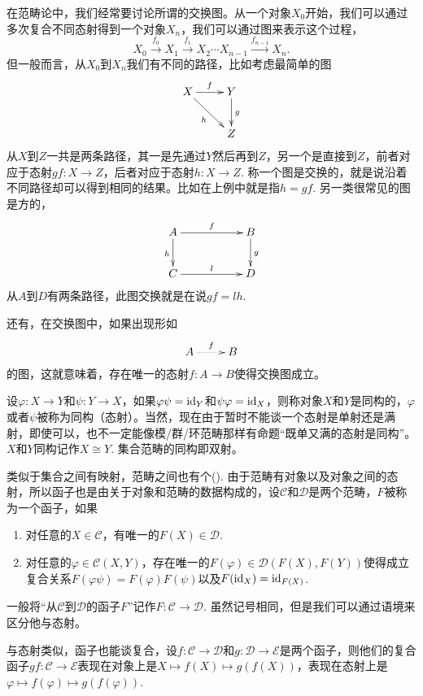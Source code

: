 \para 在范畴论中，我们经常要讨论所谓的交换图。从一个对象$X_0$开始，我们可以通过多次复合不同态射得到一个对象$X_n$，我们可以通过图来表示这个过程，
\[
	X_0\xrightarrow{f_0} X_1\xrightarrow{f_1} X_2\cdots X_{n-1}\xrightarrow{f_{n-1}} X_n.
\]
但一般而言，从$X_0$到$X_n$我们有不同的路径，比如考虑最简单的图
\[
\begin{xy}
	\xymatrix{
		X\ar[r]^{f} \ar[dr]_{h}&Y \ar[d]^{g}\\
		&Z
	}
\end{xy}
\]
从$X$到$Z$一共是两条路径，其一是先通过$Y$然后再到$Z$，另一个是直接到$Z$，前者对应于态射$gf:X\to Z$，后者对应于态射$h:X\to Z$. 称一个图是交换的，就是说沿着不同路径却可以得到相同的结果。比如在上例中就是指$h=gf$. 另一类很常见的图是方的，
\[
\begin{xy}
	\xymatrix{
		A\ar[rr]^{f} \ar[d]_{h}&&B \ar[d]^{g}\\
		C\ar[rr]^{l}&&D
	}
\end{xy}
\]
从$A$到$D$有两条路径，此图交换就是在说$gf=lh$. 

还有，在交换图中，如果出现形如
\[
\begin{xy}
	\xymatrix{
		A\ar@{.>}[r]^{f}&B
	}
\end{xy}
\]
的图，这就意味着，存在唯一的态射$f:A\to B$使得交换图成立。

\para 设$\varphi:X\to Y$和$\psi:Y\to X$，如果$\varphi\psi=\operatorname{id}_Y$和$\psi\varphi=\operatorname{id}_X$，则称对象$X$和$Y$是同构的，$\varphi$或者$\psi$被称为同构（态射）。当然，现在由于暂时不能谈一个态射是单射还是满射，即使可以，也不一定能像模/群/环范畴那样有命题“既单又满的态射是同构”。$X$和$Y$同构记作$X\cong Y$. 集合范畴的同构即双射。

\para 类似于集合之间有映射，范畴之间也有个(). 由于范畴有对象以及对象之间的态射，所以函子也是由关于对象和范畴的数据构成的，设$\mathcal{C}$和$\mathcal{D}$是两个范畴，$F$被称为一个函子，如果
\begin{enumerate}
	\item 对任意的$X\in \mathcal{C}$，有唯一的$F(X)\in \mathcal{D}$.
	
	\item 对任意的$\varphi\in \mathcal{C}(X,Y)$，存在唯一的$F(\varphi)\in  \mathcal{D}(F(X),F(Y))$使得成立复合关系$F(\varphi\psi)=F(\varphi)F(\psi)$以及$F(\operatorname{id}_X)=\operatorname{id}_{F(X)}$.
\end{enumerate}

一般将“从$\mathcal{C}$到$\mathcal{D}$的函子$F$”记作$F:\mathcal{C}\to \mathcal{D}$. 虽然记号相同，但是我们可以通过语境来区分他与态射。

与态射类似，函子也能谈复合，设$f:\mathcal{C}\to \mathcal{D}$和$g:\mathcal{D}\to \mathcal{E}$是两个函子，则他们的复合函子$gf:\mathcal{C}\to \mathcal{E}$表现在对象上是$X\mapsto f(X)\mapsto g(f(X))$，表现在态射上是$\varphi\mapsto f(\varphi)\mapsto g(f(\varphi))$. 

